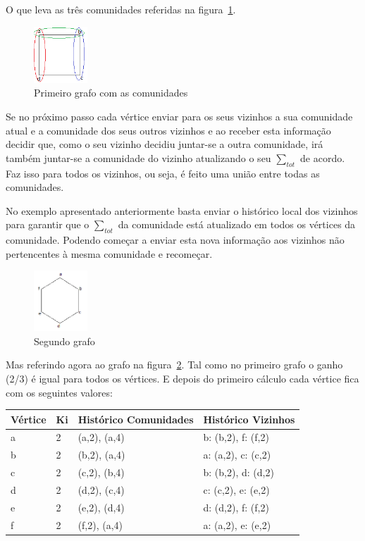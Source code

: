 \documentclass[a4paper,10pt]{report}
\begin{document}
O que leva as três comunidades referidas na figura~\ref{fig:esb2}.

\begin{figure}
\includegraphics[width=20mm]{esboco2}
\caption{Primeiro grafo com as comunidades\label{fig:esb2}}
\end{figure}

Se no próximo passo cada vértice enviar para os seus vizinhos a sua comunidade atual e a comunidade dos seus outros vizinhos e ao receber esta informação decidir que, como o seu vizinho decidiu juntar-se a outra comunidade, irá também juntar-se a comunidade do vizinho atualizando o seu $\sum_{tot}$ de acordo. Faz isso para todos os vizinhos, ou seja, é feito uma união entre todas as comunidades.


No exemplo apresentado anteriormente basta enviar o histórico local dos vizinhos para garantir que o $\sum_{tot}$ da comunidade está atualizado em todos os vértices da comunidade. Podendo começar a enviar esta nova informação aos vizinhos não pertencentes à mesma comunidade e recomeçar.

\begin{figure}
\includegraphics[width=20mm]{esboco3}
\caption{Segundo grafo\label{fig:esb3}}
\end{figure}

\newpage
 Mas referindo agora ao grafo na figura~\ref{fig:esb3}. Tal como no primeiro grafo o ganho (2/3) é igual para todos os vértices. E depois do primeiro cálculo cada vértice fica com os seguintes valores:

\begin{table}[h]
	\centering
		\begin{tabular}{ l | l | l | l }
		\hline
			Vértice & Ki & Histórico Comunidades & Histórico Vizinhos \\ \hline
			a & 2 & (a,2), (a,4) &  b: (b,2), f: (f,2)\\ \hline
			b & 2 & (b,2), (a,4) &  a: (a,2), c: (c,2)\\ \hline
			c & 2 & (c,2), (b,4) &  b: (b,2), d: (d,2)\\ \hline
			d & 2 & (d,2), (c,4) &  c: (c,2), e: (e,2)\\ \hline
			e & 2 & (e,2), (d,4) &  d: (d,2), f: (f,2)\\ \hline
			f & 2 & (f,2), (a,4) &  a: (a,2), e: (e,2)\\ \hline
		\end{tabular}
\end{table}
\end{document}
